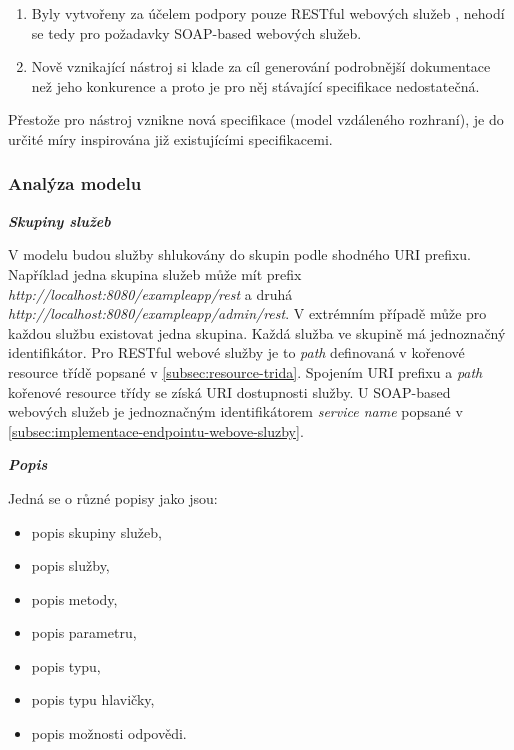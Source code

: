 \documentclass[11pt,twoside,a4paper]{book}
\begin{document}
\begin{enumerate}
  \item Byly vytvořeny za účelem podpory pouze RESTful webových služeb , nehodí
  se tedy pro požadavky SOAP-based webových služeb.
  \item Nově vznikající nástroj si klade za cíl generování podrobnější dokumentace než jeho
konkurence a proto je pro něj stávající specifikace nedostatečná.
\end{enumerate}

Přestože pro nástroj vznikne nová specifikace (model vzdáleného rozhraní), je do
určité míry inspirována již existujícími specifikacemi.

\subsubsection{Analýza modelu}

\textbf{\textit{Skupiny služeb}}

V modelu budou služby shlukovány do skupin podle shodného URI prefixu. Například jedna
skupina služeb může mít prefix {\em http://localhost:8080/exampleapp/rest} a
druhá {\em http://localhost:8080/exampleapp/admin/rest}. V extrémním případě
může pro každou službu existovat jedna skupina. Každá služba ve skupině má jednoznačný
identifikátor. Pro RESTful webové služby je to {\em path} definovaná v kořenové
resource třídě popsané v \ref{subsec:resource-trida}. Spojením URI prefixu a
{\em path} kořenové resource třídy se získá URI dostupnosti služby. U SOAP-based
webových služeb je jednoznačným identifikátorem {\em service name} popsané v
\ref{subsec:implementace-endpointu-webove-sluzby}.

\textbf{\textit{Popis}}

Jedná se o různé popisy jako jsou:

\begin{itemize}
  \item popis skupiny služeb,
  
  \item popis služby,
  
  \item popis metody,
  
  \item popis parametru,
  
  \item popis typu,
  
  \item popis typu hlavičky,
  
  \item popis možnosti odpovědi.
\end{itemize}
\end{document}
